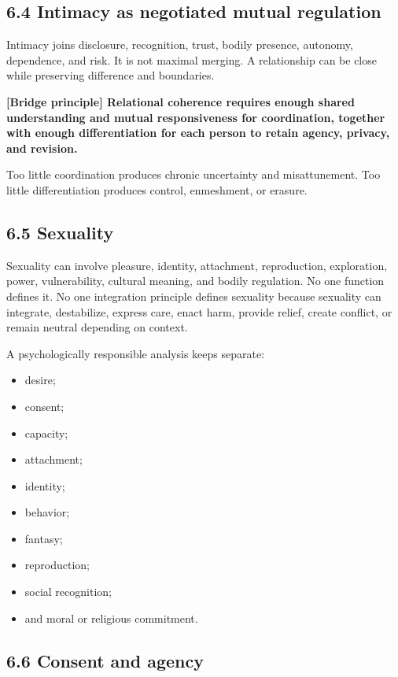 \documentclass[
  11pt,
]{article}
\providecommand{\tightlist}{%
  \setlength{\itemsep}{0pt}\setlength{\parskip}{0pt}}
\begin{document}
\subsection{6.4 Intimacy as negotiated mutual
regulation}\label{intimacy-as-negotiated-mutual-regulation}

Intimacy joins disclosure, recognition, trust, bodily presence,
autonomy, dependence, and risk. It is not maximal merging. A
relationship can be close while preserving difference and boundaries.

\textbf{{[}Bridge principle{]} Relational coherence requires enough
shared understanding and mutual responsiveness for coordination,
together with enough differentiation for each person to retain agency,
privacy, and revision.}

Too little coordination produces chronic uncertainty and misattunement.
Too little differentiation produces control, enmeshment, or erasure.

\subsection{6.5 Sexuality}\label{sexuality}

Sexuality can involve pleasure, identity, attachment, reproduction,
exploration, power, vulnerability, cultural meaning, and bodily
regulation. No one function defines it. No one integration principle
defines sexuality because sexuality can integrate, destabilize, express
care, enact harm, provide relief, create conflict, or remain neutral
depending on context.

A psychologically responsible analysis keeps separate:

\begin{itemize}
\tightlist
\item
  desire;
\item
  consent;
\item
  capacity;
\item
  attachment;
\item
  identity;
\item
  behavior;
\item
  fantasy;
\item
  reproduction;
\item
  social recognition;
\item
  and moral or religious commitment.
\end{itemize}

\subsection{6.6 Consent and agency}\label{consent-and-agency}
\end{document}

